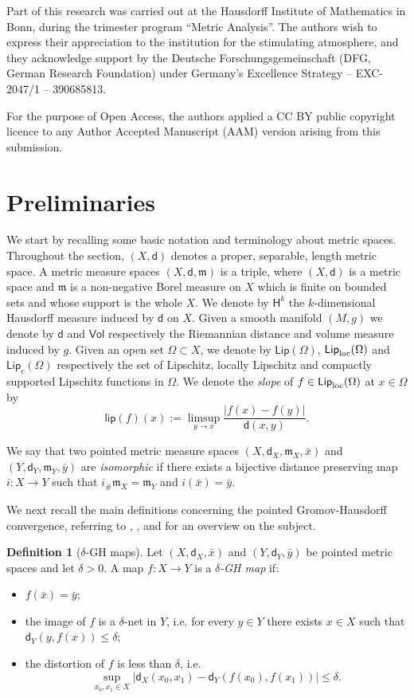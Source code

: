 \documentclass[10pt]{article}
\theoremstyle{definition}
\newtheorem{definition}[thm]{Definition}
\newcommand{\ssf}[1]{\mathsf{#1}}
\newcommand{\lip}{\mathsf{lip}}
\newcommand{\Lip}{\mathsf{Lip}}
\newcommand{\aH}{\mathsf{H}}
\newcommand{\sd}{\mathsf{d}}
\newcommand{\m}{\mathfrak{m}}
\begin{document}
Part of this research was carried out at the Hausdorff Institute of Mathematics in Bonn, during the trimester program  ``Metric Analysis''. The authors wish to express their appreciation to the  institution for the stimulating atmosphere, and they acknowledge support  by the Deutsche Forschungsgemeinschaft (DFG, German Research Foundation) under Germany's Excellence Strategy – EXC-2047/1 – 390685813. 

For the purpose of Open Access, the authors applied a CC BY public copyright licence to any Author Accepted Manuscript (AAM) version arising from this submission.


\section{Preliminaries} \label{S2}
We start by recalling some basic notation and terminology about metric spaces. Throughout the section,  $(X,\sd)$ denotes a proper, separable, length metric space.
A metric measure spaces $(X,\sd,\m)$ is a triple, where $(X,\sd)$ is a metric space and $\m$ is a non-negative Borel measure on $X$ which is finite on bounded sets and whose support is the whole $X$. We denote by $\aH^k$ the $k$-dimensional Hausdorff measure induced by $\sd$ on $X$.
Given a smooth manifold $(M,g)$ we denote by $\sd$ and $\ssf{Vol}$ respectively the Riemannian distance and volume measure induced by $g$.
Given an open set $\Omega \subset X$, we denote by $\Lip(\Omega)$, $\Lip_{\rm loc}(\Omega)$ and $\Lip_c(\Omega)$ respectively the set of  Lipschitz, locally Lipschitz and compactly supported Lipschitz functions in $\Omega$. We denote the \emph{slope} of $f \in \Lip_{\rm loc}(\Omega)$ at $x \in \Omega$ by
\[
\lip(f)(x):= \limsup_{y \to x} \frac{|f(x)-f(y)|}{\ssf{d}(x,y)}.
\]

We say that two pointed metric measure spaces $(X,\sd_X,\m_X,\bar{x})$ and $(Y,\sd_Y, \m_Y,\bar{y})$ are \emph{isomorphic} if there exists a bijective distance preserving map $i: X \to Y$ such that $i_{\#}\m_X = \m_Y$ and $i(\bar{x}) = \bar{y}$. 

We next recall the main definitions concerning the pointed Gromov-Hausdorff convergence, referring to \cite{YuBurago_1992}, \cite{Vil}, and \cite{GMS13} for an overview on the subject. 

\begin{definition}[$\delta$-GH maps]
    Let $(X,\sd_X,\bar{x})$ and $(Y,\sd_Y,\bar{y})$ be pointed metric spaces and let $\delta >0$. A map $f:X \to Y$ is a \emph{$\delta$-GH map} if:
    \begin{itemize}
   \item    $f(\bar{x})=\bar{y}$;
   \item the image of $f$ is a $\delta$-net in $Y$, i.e. for every $y\in Y$ there exists $x\in X$ such that $\sd_Y(y, f(x))\leq \delta$;  
     \item  the distortion of $f$ is less than $\delta$, i.e. 
     \[\sup_{x_0,x_1 \in X} \Big|\sd_X(x_0,x_1)-\sd_Y(f(x_0),f(x_1)) \Big| \leq \delta.
        \]
        \end{itemize}
\end{definition}
\end{document}
